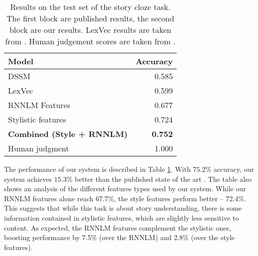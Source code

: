 \documentclass[11pt]{article}
\newcommand{\ms}[1]{{\color{cyan}\{\textit{#1}\}$_{ms}$}}
\begin{document}
\begin{table}%
\begin{center}
\begin{tabular}{|l|r|} \hline
{\bf Model} & {\bf Accuracy} \\ \hline
{DSSM} \cite{Mostafazadeh:2016} & 0.585 \\ 
{LexVec} \cite{Salle:2016} & 0.599 \\ \hline\hline
{RNNLM Features}		& 0.677 \\ 
{Stylistic features} & {0.724} \\ 
{\bf Combined (Style + RNNLM)} & {\bf 0.752} \\ \hline\hline
Human judgment & 1.000 \\ \hline
\end{tabular}
\end{center}
\caption{\label{cloze_results}
Results on the test set of the  story cloze task. 
The first block are published results, the second block are our results.
LexVec results are taken from \cite{Speer:2016}.
Human judgement scores are taken from \cite{Mostafazadeh:2016}. 
}
\end{table}

The performance of our system is described in Table \ref{cloze_results}. 
With $75.2\%$ accuracy, our system achieves $15.3\%$ better than the published state of the art \cite{Salle:2016}. 
The table also shows an analysis of the different features types used by our system.
While our RNNLM features alone reach 67.7\%, the style features perform better -- 72.4\%. 
This suggests that while this task is about story understanding, 
there is some information contained in stylistic features, which are slightly less sensitive to content.
As expected, the RNNLM features complement the stylistic ones, boosting performance by 7.5\% (over the RNNLM) and 2.8\% (over the style features). 
\end{document}

